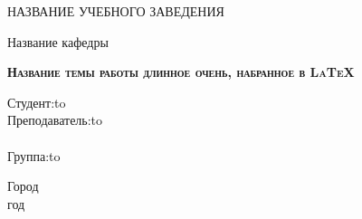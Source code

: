 \begin{titlepage}
\newpage

\begin{center}
НАЗВАНИЕ УЧЕБНОГО ЗАВЕДЕНИЯ \\
\end{center}

\vspace{8em}

\begin{center}
\Large Название кафедры \\ 
\end{center}

\vspace{2em}

\begin{center}
\textsc{\textbf{Название темы работы \linebreak длинное очень, набранное в \LaTeX{}}}
\end{center}

\vspace{6em}



\newbox{\lbox}
\newlength{\maxl}
\setlength{\maxl}{\wd\lbox}
\hfill\parbox{11cm}{
\hspace*{5cm}\hspace*{-5cm}Студент:\hfill\hbox to\\
\hspace*{5cm}\hspace*{-5cm}Преподаватель:\hfill\hbox to\\
\\
\hspace*{5cm}\hspace*{-5cm}Группа:\hfill\hbox to\\
}


\vspace{\fill}

\begin{center}
Город \\год
\end{center}

\end{titlepage}